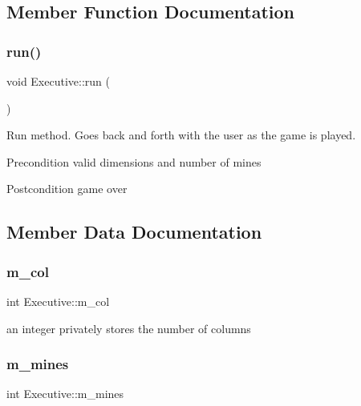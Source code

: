 \subsection{Member Function Documentation}
\mbox{\label{classExecutive_adef7cad3387e8fc79d92ffd418f45258}} 
\subsubsection{\texorpdfstring{run()}{run()}}
{\footnotesize\ttfamily void Executive\+::run (\begin{DoxyParamCaption}{ }\end{DoxyParamCaption})}



Run method. Goes back and forth with the user as the game is played. 

\begin{DoxyPrecond}{Precondition}
valid dimensions and number of mines 
\end{DoxyPrecond}
\begin{DoxyPostcond}{Postcondition}
game over 
\end{DoxyPostcond}


\subsection{Member Data Documentation}
\mbox{\label{classExecutive_a725353609296ca4465d816e2114cac74}} 
\subsubsection{\texorpdfstring{m\+\_\+col}{m\_col}}
{\footnotesize\ttfamily int Executive\+::m\+\_\+col\hspace{0.3cm}{\ttfamily [private]}}

an integer privately stores the number of columns \mbox{\label{classExecutive_adbe023edaa353b9017c293fe186fc465}} 
\subsubsection{\texorpdfstring{m\+\_\+mines}{m\_mines}}
{\footnotesize\ttfamily int Executive\+::m\+\_\+mines\hspace{0.3cm}{\ttfamily [private]}}

